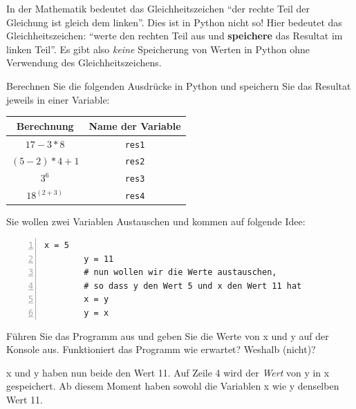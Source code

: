 \begin{myattention}
	In der Mathematik bedeutet das Gleichheitszeichen \enquote{der rechte Teil der Gleichung ist gleich dem linken}. Dies ist in Python nicht so! Hier bedeutet das Gleichheitszeichen: \enquote{werte den rechten Teil aus und \textbf{speichere} das Resultat im linken Teil}. Es gibt also \textit{keine} Speicherung von Werten in Python ohne Verwendung des Gleichheitszeichens.
\end{myattention}


\begin{myexercise}\label{ex:arithm-ausdruecke}
	Berechnen Sie die folgenden Ausdrücke in Python und speichern Sie das Resultat jeweils in einer Variable:
	\begin{table}[H]
		\centering
		\begin{tabular}{c|c}
			Berechnung      & Name der Variable \\\midrule\midrule
			$17 - 3 * 8$    & \texttt{res1}     \\\midrule
			$(5-2) * 4 + 1$ & \texttt{res2}     \\\midrule
			$3^6$           & \texttt{res3}     \\\midrule
			$18^{(2+3)}$    & \texttt{res4}
		\end{tabular}
	\end{table}
	\begin{myanswer}
		
	\end{myanswer}
\end{myexercise}

\begin{myexercise}\label{ex:austausch}
	Sie wollen zwei Variablen Austauschen und kommen auf folgende Idee:
	\begin{lstlisting}[numbers=left]
        x = 5 
        y = 11
        # nun wollen wir die Werte austauschen, 
        # so dass y den Wert 5 und x den Wert 11 hat
        x = y
        y = x
\end{lstlisting}
	Führen Sie das Programm aus und geben Sie die Werte von x und y auf der Konsole aus. Funktioniert das Programm wie erwartet? Weshalb (nicht)?
	\begin{myanswer}
		x und y haben nun beide den Wert 11. Auf Zeile 4 wird der \textit{Wert} von y in x gespeichert. Ab diesem Moment haben sowohl die Variablen x wie y denselben Wert 11.
	\end{myanswer}
\end{myexercise}

